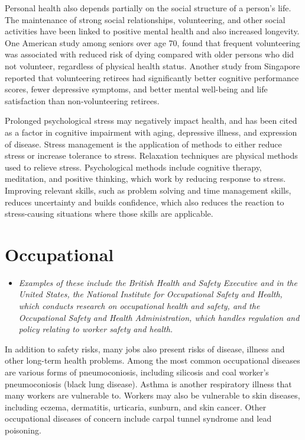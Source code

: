 Personal health also depends partially on the social structure of a
person's life. The maintenance of strong social relationships,
volunteering, and other social activities have been linked to positive
mental health and also increased longevity. One American study among
seniors over age 70, found that frequent volunteering was associated
with reduced risk of dying compared with older persons who did not
volunteer, regardless of physical health status. Another study from
Singapore reported that volunteering retirees had significantly better
cognitive performance scores, fewer depressive symptoms, and better
mental well-being and life satisfaction than non-volunteering retirees.

Prolonged psychological stress may negatively impact health, and has
been cited as a factor in cognitive impairment with aging, depressive
illness, and expression of disease. Stress management is the application
of methods to either reduce stress or increase tolerance to stress.
Relaxation techniques are physical methods used to relieve stress.
Psychological methods include cognitive therapy, meditation, and
positive thinking, which work by reducing response to stress. Improving
relevant skills, such as problem solving and time management skills,
reduces uncertainty and builds confidence, which also reduces the
reaction to stress-causing situations where those skills are applicable.

\section{Occupational}\label{occupational}

\begin{itemize}
\item
  \emph{Examples of these include the British Health and Safety
  Executive and in the United States, the National Institute for
  Occupational Safety and Health, which conducts research on
  occupational health and safety, and the Occupational Safety and Health
  Administration, which handles regulation and policy relating to worker
  safety and health.}
\end{itemize}

In addition to safety risks, many jobs also present risks of disease,
illness and other long-term health problems. Among the most common
occupational diseases are various forms of pneumoconiosis, including
silicosis and coal worker's pneumoconiosis (black lung disease). Asthma
is another respiratory illness that many workers are vulnerable to.
Workers may also be vulnerable to skin diseases, including eczema,
dermatitis, urticaria, sunburn, and skin cancer. Other occupational
diseases of concern include carpal tunnel syndrome and lead poisoning.


